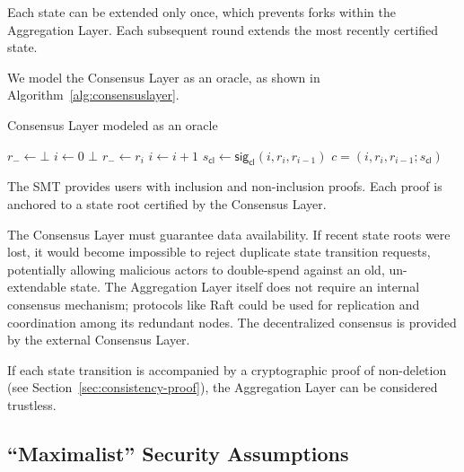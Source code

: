 \documentclass[twocolumn]{article}
\begin{document}
Each state can be extended only once, which prevents forks within the Aggregation Layer. Each subsequent round extends the most recently certified state.

We model the Consensus Layer as an oracle, as shown in Algorithm~\ref{alg:consensuslayer}.

\begin{algorithm}[tbh]
  \caption{Consensus Layer modeled as an oracle}\label{alg:consensuslayer}
  \begin{algorithmic}[0]
        \State $r_- \gets \bot$
        \State $i \gets 0$
    \EndFunction
            \State \Return $\bot$
        \EndIf
        \State $r_- \gets r_i$
        \State $i \gets i+1$
        \State $s_{\textsf{cl}} \gets \textsf{sig}_\textsf{cl}(i, r_i, r_{i-1})$
        \State \Return $c = (i, r_i, r_{i-1}; s_{\textsf{cl}})$
    \EndFunction
  \end{algorithmic}
\end{algorithm}


The SMT provides users with inclusion and non-inclusion proofs. Each proof is anchored to a state root certified by the Consensus Layer.

The Consensus Layer must guarantee data availability. If recent state roots were lost, it would become impossible to reject duplicate state transition requests, potentially allowing malicious actors to double-spend against an old, un-extendable state. The Aggregation Layer itself does not require an internal consensus mechanism; protocols like Raft could be used for replication and coordination among its redundant nodes. The decentralized consensus is provided by the external Consensus Layer.

If each state transition is accompanied by a cryptographic proof of non-deletion (see Section~\ref{sec:consistency-proof}), the Aggregation Layer can be considered trustless.



\subsection{``Maximalist'' Security Assumptions}
\end{document}
